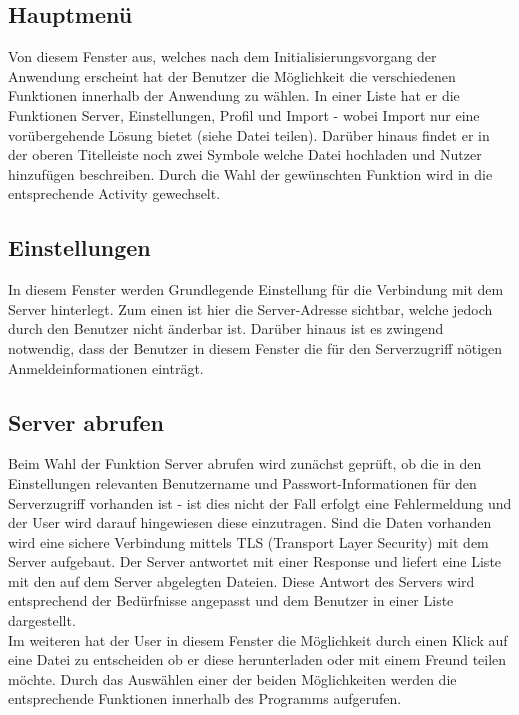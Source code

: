 \documentclass[10pt, a4paper,headsepline]{scrreprt}
\begin{document}
\subsection{Hauptmenü}
Von diesem Fenster aus, welches nach dem Initialisierungsvorgang der Anwendung erscheint hat der Benutzer die Möglichkeit die verschiedenen Funktionen innerhalb der Anwendung zu wählen. In einer Liste hat er die Funktionen Server, Einstellungen, Profil und Import - wobei Import nur eine vorübergehende Lösung bietet  (siehe Datei teilen). Darüber hinaus findet er in der oberen Titelleiste noch zwei Symbole welche Datei hochladen und Nutzer hinzufügen beschreiben. Durch die Wahl der gewünschten Funktion wird in die entsprechende Activity gewechselt.


\subsection{Einstellungen}
In diesem Fenster werden Grundlegende Einstellung für die Verbindung mit dem Server hinterlegt. Zum einen ist hier die Server-Adresse sichtbar, welche jedoch durch den Benutzer nicht änderbar ist. Darüber hinaus ist es zwingend notwendig, dass der Benutzer in diesem Fenster die für den Serverzugriff nötigen Anmeldeinformationen einträgt.


\subsection{Server abrufen}
Beim Wahl der Funktion Server abrufen wird zunächst geprüft, ob die in den Einstellungen relevanten Benutzername und Passwort-Informationen für den Serverzugriff vorhanden ist - ist dies nicht der Fall erfolgt eine Fehlermeldung und der User wird darauf hingewiesen diese einzutragen. Sind die Daten vorhanden wird eine sichere Verbindung mittels TLS (Transport Layer Security) mit dem Server aufgebaut. Der Server antwortet mit einer Response und liefert eine Liste mit den auf dem Server abgelegten Dateien. Diese Antwort des Servers wird entsprechend der Bedürfnisse angepasst und dem Benutzer in einer Liste dargestellt. \\
Im weiteren hat der User in diesem Fenster die Möglichkeit durch einen Klick auf eine Datei zu entscheiden ob er diese herunterladen oder mit einem Freund teilen möchte. Durch das Auswählen einer der beiden Möglichkeiten werden die entsprechende Funktionen innerhalb des Programms aufgerufen.
\end{document}
